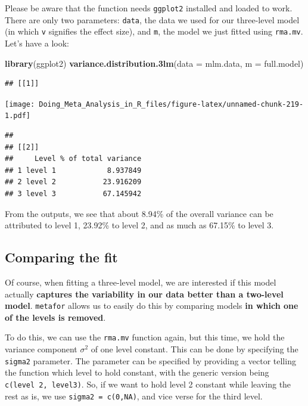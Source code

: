 \documentclass[]{book}
\newenvironment{Shaded}{\begin{snugshade}}{\end{snugshade}}
\newcommand{\DataTypeTok}[1]{\textcolor[rgb]{0.13,0.29,0.53}{#1}}
\newcommand{\KeywordTok}[1]{\textcolor[rgb]{0.13,0.29,0.53}{\textbf{#1}}}
\newcommand{\NormalTok}[1]{#1}
\begin{document}
Please be aware that the function needs \texttt{ggplot2} installed and loaded to work. There are only two parameters: \texttt{data}, the data we used for our three-level model (in which \texttt{v} signifies the effect size), and \texttt{m}, the model we just fitted using \texttt{rma.mv}. Let's have a look:

\begin{Shaded}
\begin{Highlighting}[]
\KeywordTok{library}\NormalTok{(ggplot2)}
\KeywordTok{variance.distribution.3lm}\NormalTok{(}\DataTypeTok{data =}\NormalTok{ mlm.data,}
                          \DataTypeTok{m =}\NormalTok{ full.model)}
\end{Highlighting}
\end{Shaded}

\begin{verbatim}
## [[1]]
\end{verbatim}

\texttt{[image: Doing\_Meta\_Analysis\_in\_R\_files/figure-latex/unnamed-chunk-219-1.pdf]}

\begin{verbatim}
## 
## [[2]]
##     Level % of total variance
## 1 level 1            8.937849
## 2 level 2           23.916209
## 3 level 3           67.145942
\end{verbatim}

From the outputs, we see that about 8.94\% of the overall variance can be attributed to level 1, 23.92\% to level 2, and as much as 67.15\% to level 3.

\hypertarget{comparing-the-fit}{%
\subsection{Comparing the fit}\label{comparing-the-fit}}

Of course, when fitting a three-level model, we are interested if this model actually \textbf{captures the variability in our data better than a two-level model}. \texttt{metafor} allows us to easily do this by comparing models \textbf{in which one of the levels is removed}.

To do this, we can use the \texttt{rma.mv} function again, but this time, we hold the variance component \(\sigma^2\) of one level constant. This can be done by specifying the \texttt{sigma2} parameter. The parameter can be specified by providing a vector telling the function which level to hold constant, with the generic version being \texttt{c(level\ 2,\ level3)}. So, if we want to hold level 2 constant while leaving the rest as is, we use \texttt{sigma2\ =\ c(0,NA)}, and vice verse for the third level.
\end{document}
